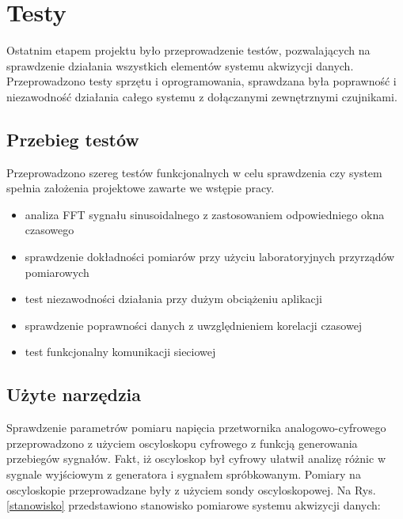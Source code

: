 \chapter{Testy}
\label{ch:testy}

Ostatnim etapem projektu było przeprowadzenie testów, pozwalających na sprawdzenie działania wszystkich elementów systemu akwizycji danych. Przeprowadzono testy sprzętu i oprogramowania, sprawdzana była poprawność i niezawodność działania całego systemu z dołączanymi zewnętrznymi czujnikami.

 
\section{Przebieg testów}
Przeprowadzono szereg testów funkcjonalnych w celu sprawdzenia czy system spełnia założenia projektowe zawarte we wstępie pracy. 


\begin{itemize}
\item analiza FFT sygnału sinusoidalnego z zastosowaniem odpowiedniego okna czasowego
\item sprawdzenie dokładności pomiarów przy użyciu laboratoryjnych przyrządów pomiarowych 
\item test niezawodności działania przy dużym obciążeniu aplikacji
\item sprawdzenie poprawności danych z uwzględnieniem korelacji czasowej
\item test funkcjonalny komunikacji sieciowej
\end{itemize}

\section{Użyte narzędzia}
Sprawdzenie parametrów pomiaru napięcia przetwornika analogowo-cyfrowego przeprowadzono z użyciem oscyloskopu cyfrowego z funkcją generowania przebiegów sygnałów. Fakt, iż oscyloskop był cyfrowy ułatwił analizę różnic w sygnale wyjściowym z generatora i sygnałem spróbkowanym. Pomiary na oscyloskopie przeprowadzane były z użyciem sondy oscyloskopowej. Na Rys. \ref{stanowisko} przedstawiono stanowisko pomiarowe systemu akwizycji danych:

